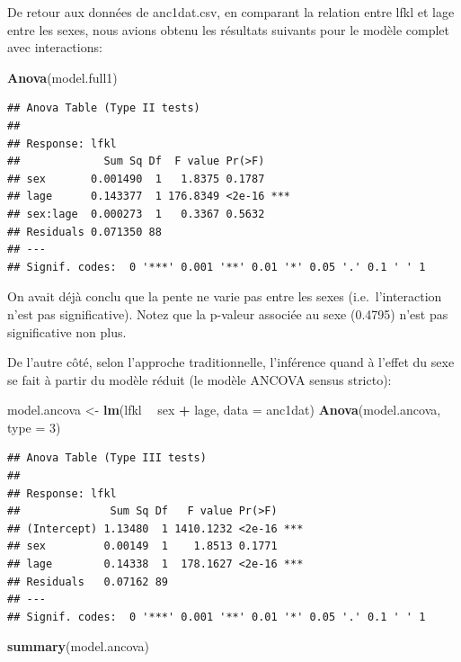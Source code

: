 \documentclass[12pt,]{book}
\newenvironment{Shaded}{\begin{snugshade}}{\end{snugshade}}
\newcommand{\DataTypeTok}[1]{\textcolor[rgb]{0.13,0.29,0.53}{#1}}
\newcommand{\DecValTok}[1]{\textcolor[rgb]{0.00,0.00,0.81}{#1}}
\newcommand{\KeywordTok}[1]{\textcolor[rgb]{0.13,0.29,0.53}{\textbf{#1}}}
\newcommand{\NormalTok}[1]{#1}
\newcommand{\OperatorTok}[1]{\textcolor[rgb]{0.81,0.36,0.00}{\textbf{#1}}}
\newcommand{\StringTok}[1]{\textcolor[rgb]{0.31,0.60,0.02}{#1}}
\begin{document}
De retour aux données de anc1dat.csv, en comparant la relation entre lfkl et lage entre les sexes, nous avions obtenu les résultats suivants pour le modèle complet avec interactions:

\begin{Shaded}
\begin{Highlighting}[]
\KeywordTok{Anova}\NormalTok{(model.full1)}
\end{Highlighting}
\end{Shaded}

\begin{verbatim}
## Anova Table (Type II tests)
## 
## Response: lfkl
##             Sum Sq Df  F value Pr(>F)    
## sex       0.001490  1   1.8375 0.1787    
## lage      0.143377  1 176.8349 <2e-16 ***
## sex:lage  0.000273  1   0.3367 0.5632    
## Residuals 0.071350 88                    
## ---
## Signif. codes:  0 '***' 0.001 '**' 0.01 '*' 0.05 '.' 0.1 ' ' 1
\end{verbatim}

On avait déjà conclu que la pente ne varie pas entre les sexes (i.e.~l'interaction n'est pas significative). Notez que la p-valeur associée au sexe (0.4795) n'est pas significative non plus.

De l'autre côté, selon l'approche traditionnelle, l'inférence quand à l'effet du sexe se fait à partir du modèle réduit (le modèle ANCOVA sensus stricto):

\begin{Shaded}
\begin{Highlighting}[]
\NormalTok{model.ancova <-}\StringTok{ }\KeywordTok{lm}\NormalTok{(lfkl }\OperatorTok{~}\StringTok{ }\NormalTok{sex }\OperatorTok{+}\StringTok{ }\NormalTok{lage, }\DataTypeTok{data =}\NormalTok{ anc1dat)}
\KeywordTok{Anova}\NormalTok{(model.ancova, }\DataTypeTok{type =} \DecValTok{3}\NormalTok{)}
\end{Highlighting}
\end{Shaded}

\begin{verbatim}
## Anova Table (Type III tests)
## 
## Response: lfkl
##              Sum Sq Df   F value Pr(>F)    
## (Intercept) 1.13480  1 1410.1232 <2e-16 ***
## sex         0.00149  1    1.8513 0.1771    
## lage        0.14338  1  178.1627 <2e-16 ***
## Residuals   0.07162 89                     
## ---
## Signif. codes:  0 '***' 0.001 '**' 0.01 '*' 0.05 '.' 0.1 ' ' 1
\end{verbatim}

\begin{Shaded}
\begin{Highlighting}[]
\KeywordTok{summary}\NormalTok{(model.ancova)}
\end{Highlighting}
\end{Shaded}
\end{document}
